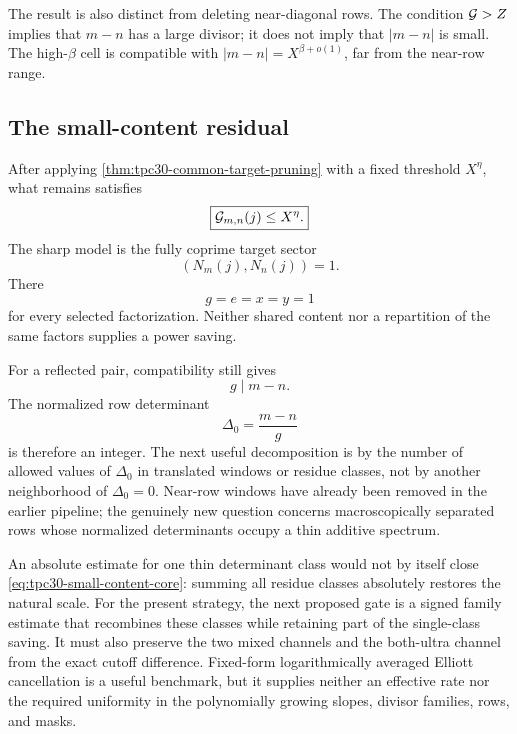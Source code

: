 The result is also distinct from deleting near-diagonal rows.  The
condition $\mathcal G>Z$ implies that $m-n$ has a large divisor; it does not
imply that $|m-n|$ is small.  The high-$\beta$ cell is compatible with
$|m-n|=X^{\beta+o(1)}$, far from the near-row range.

\subsection{The small-content residual}

After applying \cref{thm:tpc30-common-target-pruning} with a fixed
threshold $X^\eta$, what remains satisfies
\begin{equation}
 \boxed{
 \mathcal G_{m,n}(j)\le X^\eta.}
 \label{eq:tpc30-small-content-core}
\end{equation}
The sharp model is the fully coprime target sector
\begin{equation}
 (N_m(j),N_n(j))=1.
 \label{eq:tpc30-coprime-target-core}
\end{equation}
There
\[
 g=e=x=y=1
\]
for every selected factorization.  Neither shared content nor a
repartition of the same factors supplies a power saving.

For a reflected pair, compatibility still gives
\[
 g\mid m-n.
\]
The normalized row determinant
\begin{equation}
 \Delta_0=\frac{m-n}{g}
 \label{eq:tpc30-normalized-determinant}
\end{equation}
is therefore an integer.  The next useful decomposition is by the
number of allowed values of $\Delta_0$ in translated windows or residue
classes, not by another neighborhood of $\Delta_0=0$.  Near-row windows
have already been removed in the earlier pipeline; the genuinely new
question concerns macroscopically separated rows whose normalized
determinants occupy a thin additive spectrum.

An absolute estimate for one thin determinant class would not by
itself close \eqref{eq:tpc30-small-content-core}: summing all residue
classes absolutely restores the natural scale.  For the present
strategy, the next proposed gate is a signed family estimate that
recombines these classes while retaining
part of the single-class saving.  It must also preserve the two mixed
channels and the both-ultra channel from the exact cutoff difference.
Fixed-form logarithmically averaged Elliott cancellation
\citep{Tao2016} is a useful benchmark, but it supplies neither an
effective rate nor the required uniformity in the polynomially
growing slopes, divisor families, rows, and masks.

